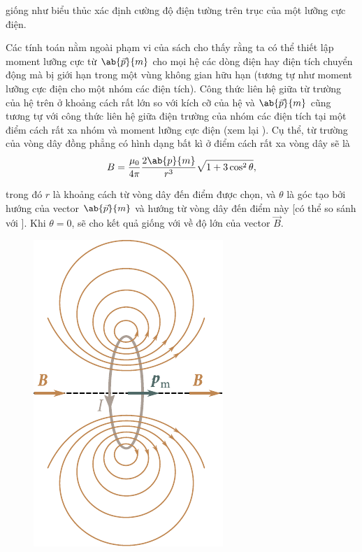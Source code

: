 \noindent
giống như biểu thủc  xác định cường độ điện tường trên trục của một lưỡng cực điện.

Các tính toán nằm ngoài phạm vi của sách cho thấy rằng ta có thể thiết lập moment lưỡng cực từ $\ab{\vec{p}}{m}$ cho mọi hệ các dòng điện hay điện tích chuyển động mà bị giới hạn trong một vùng không gian hữu hạn (tương tự như moment lưỡng cực điện cho một nhóm các điện tích). Công thức liên hệ giữa từ trường của hệ trên ở khoảng cách rất lớn so với kích cỡ của hệ và $\ab{\vec{p}}{m}$ cũng tương tự với công thức liên hệ giữa điện trường của nhóm các điện tích tại một điểm cách rất xa nhóm và moment lưỡng cực điện (xem lại ). Cụ thể, từ trường của vòng dây đồng phẳng có hình dạng bất kì ở điểm cách rất xa vòng dây sẽ là
\begin{equation}\label{eq:6_83}
    B = \frac{\mu_0}{4\pi} \frac{2 \ab{p}{m}}{r^3} \sqrt{1 + 3 \cos^2\theta},
\end{equation}

\noindent
trong đó $r$ là khoảng cách từ vòng dây đến điểm được chọn, và $\theta$ là góc tạo bởi hướng của vector $\ab{\vec{p}}{m}$ và hướng từ vòng dây đến điểm này [có thể so sánh với ]. Khi $\theta=0$,  sẽ cho kết quả giống với  về độ lớn của vector $\vec{B}$.

\begin{figure}[t]
	\begin{center}
		\includegraphics[scale=1]{figures/ch_06/fig_6_20.pdf}
		\caption[]{}
		\label{fig:6_20}
	\end{center}
	\vspace{-0.8cm}
\end{figure}

